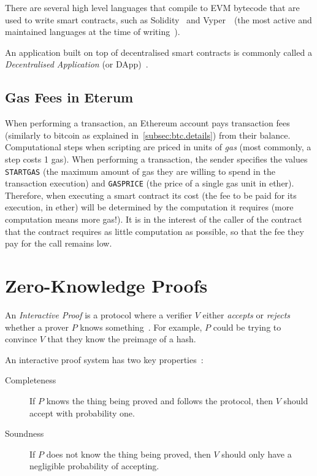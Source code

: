 There are several high level languages that compile to EVM bytecode that are used to write smart contracts, such as
Solidity~\cite{solidity_repo} and Vyper~\cite{vyper_repo}~(the most active and maintained languages at the
time of writing~\cite{eth_smartContractLangs}).


An application built on top of decentralised smart contracts is commonly called a \textit{Decentralised Application} (or
DApp)~\cite{masteringEthGlossary}.

\subsection{Gas Fees in Eterum}\label{subsec:eth:gas}

When performing a transaction, an Ethereum account pays transaction fees (similarly to bitcoin as explained
in~\ref{subsec:btc.details}) from their balance.
Computational steps when scripting are priced in units of \textit{gas} (most commonly, a step costs 1 gas).
When performing a transaction, the sender specifies the values \texttt{STARTGAS} (the maximum amount of gas they are
willing to spend in the transaction execution) and \texttt{GASPRICE} (the price of a single gas unit in ether).\\

Therefore, when executing a smart contract its cost (the fee to be paid for its execution, in ether) will be determined
by the computation it requires (more computation means more gas!).
It is in the interest of the caller of the contract that the contract requires as little computation as possible, so
that the fee they pay for the call remains low.



\section{Zero-Knowledge Proofs}\label{sec:zero-knowledge-proofs}

An \textit{Interactive Proof} is a protocol where a verifier $V$ either \textit{accepts} or \textit{rejects} whether a
prover $P$ knows something~\cite{damgaard1998zk_protocols}.
For example, $P$ could be trying to convince $V$ that they know the preimage of a hash.

An interactive proof system has two key properties~\cite{smart2016zeroknowledgeproofs}:
\begin{description}
    \item[Completeness] If $P$ knows the thing being proved and follows the protocol, then $V$ should accept with
    probability one.
    \item[Soundness] If $P$ does not know the thing being proved, then $V$ should only have a negligible probability of
    accepting.
\end{description}

